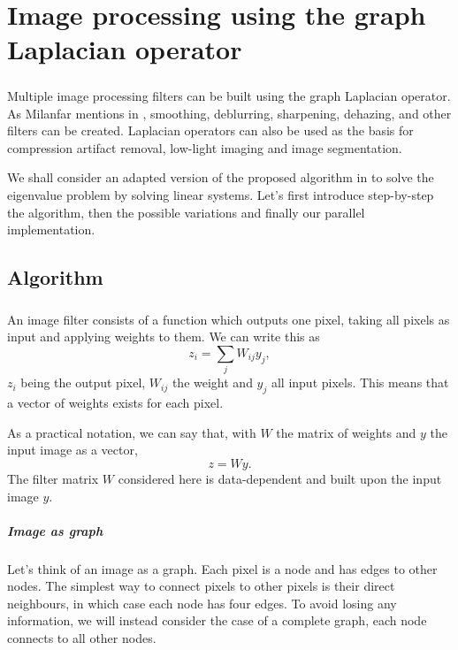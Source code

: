 \chapter{Image processing using the graph Laplacian operator}

\paragraph{}
Multiple image processing filters can be built using the graph Laplacian operator.
As Milanfar mentions in \cite{siam_slides_2016}, smoothing, deblurring, sharpening, dehazing, and other filters can be created.
Laplacian operators can also be used as the basis for compression artifact removal, low-light imaging and image segmentation.

We shall consider an adapted version of the proposed algorithm in \cite{glide_2014} to solve the eigenvalue problem by solving linear systems.
Let's first introduce step-by-step the algorithm, then the possible variations and finally our parallel implementation.

\section{Algorithm}

\paragraph{}
An image filter consists of a function which outputs one pixel, taking all pixels as input and applying weights to them. We can write this as
\[z_i = \sum_j W_{ij}y_j,\]
\(z_i\) being the output pixel, \(W_{ij}\) the weight and \(y_j\) all input pixels.
This means that a vector of weights exists for each pixel.

As a practical notation, we can say that, with \(W\) the matrix of weights and \(y\) the input image as a vector,
\[z = Wy.\]
The filter matrix \(W\) considered here is data-dependent and built upon the input image \(y\).

\paragraph{Image as graph}
Let's think of an image as a graph.
Each pixel is a node and has edges to other nodes.
The simplest way to connect pixels to other pixels is their direct neighbours, in which case each node has four edges.
To avoid losing any information, we will instead consider the case of a complete graph, each node connects to all other nodes.


